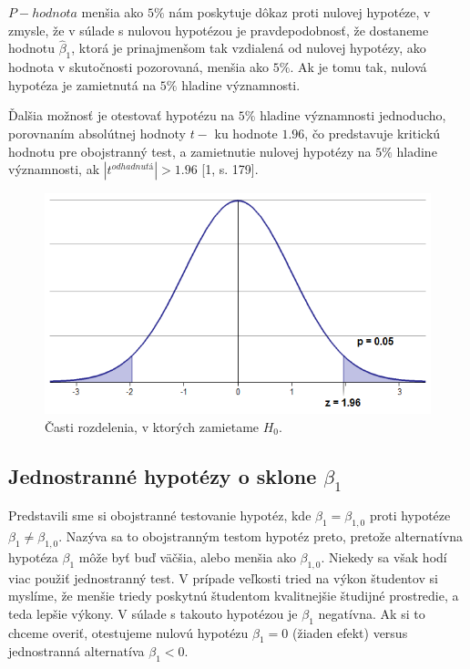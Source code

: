 \documentclass[]{tukediphc}
\begin{document}
$P-hodnota$ menšia ako $5\%$ nám poskytuje dôkaz proti nulovej hypotéze, v zmysle, že v súlade s nulovou hypotézou je pravdepodobnosť, že dostaneme hodnotu $\hat\beta_{1}$, ktorá je prinajmenšom tak vzdialená od nulovej hypotézy, ako hodnota v skutočnosti pozorovaná, menšia ako $5\%$. Ak je tomu tak, nulová hypotéza je zamietnutá na $5\%$ hladine významnosti.  

Ďalšia možnosť je otestovať hypotézu na $5\%$ hladine významnosti jednoducho, porovnaním absolútnej hodnoty $t-$ ku hodnote $1.96$, čo predstavuje kritickú hodnotu pre obojstranný test, a zamietnutie nulovej hypotézy na $5\%$ hladine významnosti, ak $|t^{odhadnutá}| > 1.96$ [1, s. 179].

\begin{figure} 
    \centering 
    \includegraphics[scale = 0.5]{diplomka obrazky/12.png} 
    \caption{Časti rozdelenia, v ktorých zamietame $H_0$.} 
\end{figure} 

\subsection{Jednostranné hypotézy o sklone $\beta_{1}$}

Predstavili sme si obojstranné testovanie hypotéz, kde $\beta_{1} = \beta_{1, 0}$ proti hypotéze $\beta_{1} \neq \beta_{1, 0}$. Nazýva sa to obojstranným testom hypotéz preto, pretože alternatívna hypotéza $\beta_{1}$ môže byť buď väčšia, alebo menšia ako $\beta_{1, 0}$. Niekedy sa však hodí viac použiť jednostranný test. V prípade veľkosti tried na výkon študentov si myslíme, že menšie triedy poskytnú študentom kvalitnejšie študijné prostredie, a teda lepšie výkony. V súlade s takouto hypotézou je $\beta_{1}$ negatívna. Ak si to chceme overiť, otestujeme nulovú hypotézu $\beta_{1} = 0$ (žiaden efekt) versus jednostranná alternatíva $\beta_{1} < 0$.  
\end{document}
